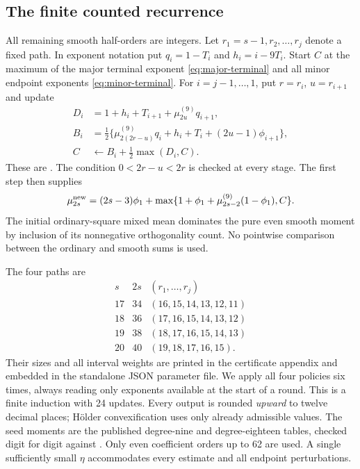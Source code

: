 \documentclass[11pt,letterpaper]{article}
\numberwithin{equation}{section}
\begin{document}
\subsection{The finite counted recurrence}

All remaining smooth half-orders are integers.  Let
$r_1=s-1,r_2,\ldots,r_j$ denote a fixed path.  In exponent notation put
$q_i=1-T_i$ and $h_i=i-9T_i$.  Start $C$ at the maximum of the
major terminal exponent \eqref{eq:major-terminal} and all minor
endpoint exponents \eqref{eq:minor-terminal}.  For $i=j-1,\ldots,1$,
put $r=r_i$, $u=r_{i+1}$ and update
\begin{align}
 D_i&=1+h_i+T_{i+1}+\mu_{2u}^{(9)}q_{i+1},\\
 B_i&=\frac12\{\mu_{2(2r-u)}^{(9)}q_i+h_i+T_i
                                      +(2u-1)\phi_{i+1}\},\\
 C&\longleftarrow B_i+\frac12\max(D_i,C).
 \label{eq:counted-backward}
\end{align}
These are \cite[Lemma 2.2, including its corrected indices]{VW00}.
The condition $0<2r-u<2r$ is checked at every stage.  The first step
\cite[Lemma 2.1]{VW00} then supplies
\begin{equation}
 \mu_{2s}^{\rm new}=(2s-3)\phi_1+
  \max\{1+\phi_1+\mu_{2s-2}^{(9)}(1-\phi_1),C\}.
 \label{eq:first-step}
\end{equation}
The initial ordinary-square mixed mean dominates the pure even smooth
moment by inclusion of its nonnegative orthogonality count.  No
pointwise comparison between the ordinary and smooth sums is used.

The four paths are
\[
\begin{array}{ccl}
s&2s& (r_1,\ldots,r_j)\\\hline
17&34&(16,15,14,13,12,11)\\
18&36&(17,16,15,14,13,12)\\
19&38&(18,17,16,15,14,13)\\
20&40&(19,18,17,16,15).
\end{array}
\]
Their sizes and all interval weights are printed in the certificate
appendix and embedded in the standalone JSON parameter file.
We apply all four policies six times, always reading only exponents
available at the start of a round.  This is a finite induction with
24 updates.  Every output is rounded \emph{upward} to twelve decimal
places; H\"older convexification uses only already admissible values.
The seed moments are the published degree-nine and degree-eighteen
tables, checked digit for digit against \cite[Sections 11 and 20]{VW00}.
Only even coefficient orders up to 62 are used.  A single sufficiently
small $\eta$ accommodates every estimate and all endpoint perturbations.
\end{document}
